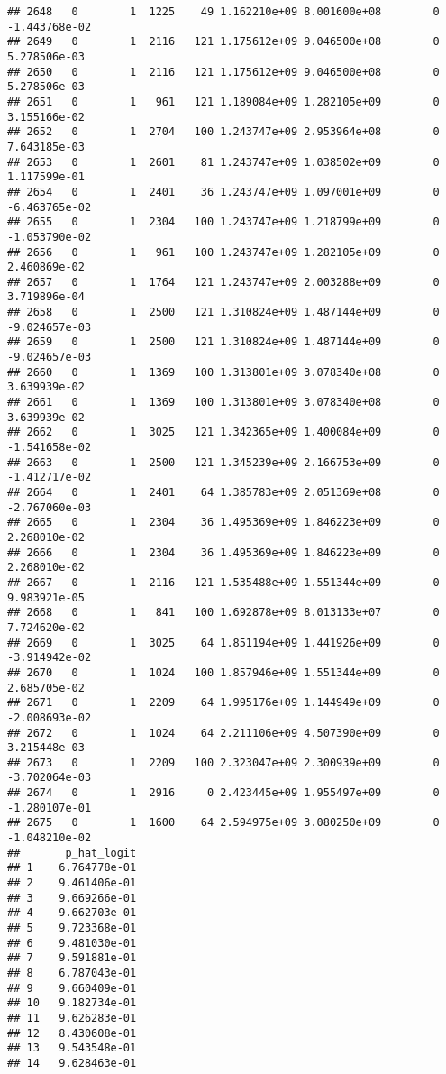 \documentclass[
]{article}
\begin{document}
\begin{enumerate}
\begin{verbatim}
## 2648   0        1  1225    49 1.162210e+09 8.001600e+08        0 -1.443768e-02
## 2649   0        1  2116   121 1.175612e+09 9.046500e+08        0  5.278506e-03
## 2650   0        1  2116   121 1.175612e+09 9.046500e+08        0  5.278506e-03
## 2651   0        1   961   121 1.189084e+09 1.282105e+09        0  3.155166e-02
## 2652   0        1  2704   100 1.243747e+09 2.953964e+08        0  7.643185e-03
## 2653   0        1  2601    81 1.243747e+09 1.038502e+09        0  1.117599e-01
## 2654   0        1  2401    36 1.243747e+09 1.097001e+09        0 -6.463765e-02
## 2655   0        1  2304   100 1.243747e+09 1.218799e+09        0 -1.053790e-02
## 2656   0        1   961   100 1.243747e+09 1.282105e+09        0  2.460869e-02
## 2657   0        1  1764   121 1.243747e+09 2.003288e+09        0  3.719896e-04
## 2658   0        1  2500   121 1.310824e+09 1.487144e+09        0 -9.024657e-03
## 2659   0        1  2500   121 1.310824e+09 1.487144e+09        0 -9.024657e-03
## 2660   0        1  1369   100 1.313801e+09 3.078340e+08        0  3.639939e-02
## 2661   0        1  1369   100 1.313801e+09 3.078340e+08        0  3.639939e-02
## 2662   0        1  3025   121 1.342365e+09 1.400084e+09        0 -1.541658e-02
## 2663   0        1  2500   121 1.345239e+09 2.166753e+09        0 -1.412717e-02
## 2664   0        1  2401    64 1.385783e+09 2.051369e+08        0 -2.767060e-03
## 2665   0        1  2304    36 1.495369e+09 1.846223e+09        0  2.268010e-02
## 2666   0        1  2304    36 1.495369e+09 1.846223e+09        0  2.268010e-02
## 2667   0        1  2116   121 1.535488e+09 1.551344e+09        0  9.983921e-05
## 2668   0        1   841   100 1.692878e+09 8.013133e+07        0  7.724620e-02
## 2669   0        1  3025    64 1.851194e+09 1.441926e+09        0 -3.914942e-02
## 2670   0        1  1024   100 1.857946e+09 1.551344e+09        0  2.685705e-02
## 2671   0        1  2209    64 1.995176e+09 1.144949e+09        0 -2.008693e-02
## 2672   0        1  1024    64 2.211106e+09 4.507390e+09        0  3.215448e-03
## 2673   0        1  2209   100 2.323047e+09 2.300939e+09        0 -3.702064e-03
## 2674   0        1  2916     0 2.423445e+09 1.955497e+09        0 -1.280107e-01
## 2675   0        1  1600    64 2.594975e+09 3.080250e+09        0 -1.048210e-02
##       p_hat_logit
## 1    6.764778e-01
## 2    9.461406e-01
## 3    9.669266e-01
## 4    9.662703e-01
## 5    9.723368e-01
## 6    9.481030e-01
## 7    9.591881e-01
## 8    6.787043e-01
## 9    9.660409e-01
## 10   9.182734e-01
## 11   9.626283e-01
## 12   8.430608e-01
## 13   9.543548e-01
## 14   9.628463e-01

\end{verbatim}
\end{enumerate}
\end{document}
